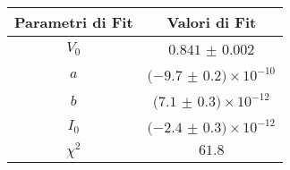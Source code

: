 \begin{tabular}{cc}
\hline
	Parametri di Fit & Valori di Fit\\ 
\hline
	$V_0$ & $0.841$ $\pm$ $0.002$ \\
	$a$ & $(-9.7$ $\pm$ $0.2)\times 10^{-10}$ \\
	$b$ & $(7.1$ $\pm$ $0.3)\times 10^{-12}$ \\
	$I_0$ & $(-2.4$ $\pm$ $0.3)\times 10^{-12}$ \\
	$\chi^2$ & $61.8$ \\
\hline
\end{tabular}
